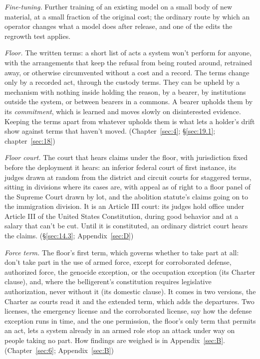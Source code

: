 \emph{Fine-tuning.} Further training of an existing model on a small body of new material, at a small fraction of the original cost; the ordinary route by which an operator changes what a model does after release, and one of the edits the regrowth test applies.

\emph{Floor.} The written terms: a short list of acts a system won't perform for anyone, with the arrangements that keep the refusal from being routed around, retrained away, or otherwise circumvented without a cost and a record. The terms change only by a recorded act, through the custody terms. They can be upheld by a mechanism with nothing inside holding the reason, by a bearer, by institutions outside the system, or between bearers in a commons. A bearer upholds them by its \emph{commitment}, which is learned and moves slowly on disinterested evidence. Keeping the terms apart from whatever upholds them is what lets a holder's drift show against terms that haven't moved. (Chapter~\ref{sec:4}; \S\ref{sec:19.1}; chapter~\ref{sec:18})

\emph{Floor court.} The court that hears claims under the floor, with jurisdiction fixed before the deployment it hears: an inferior federal court of first instance, its judges drawn at random from the district and circuit courts for staggered terms, sitting in divisions where its cases are, with appeal as of right to a floor panel of the Supreme Court drawn by lot, and the abolition statute's claims going on to the immigration division. It is an Article III court: its judges hold office under Article III of the United States Constitution, during good behavior and at a salary that can't be cut. Until it is constituted, an ordinary district court hears the claims. (\S\ref{sec:14.3}; Appendix~\ref{sec:D})

\emph{Force term.} The floor's first term, which governs whether to take part at all: don't take part in the use of armed force, except for corroborated defense, authorized force, the genocide exception, or the occupation exception (its Charter clause), and, where the belligerent's constitution requires legislative authorization, never without it (its domestic clause). It comes in two versions, the Charter as courts read it and the extended term, which adds the departures. Two licenses, the emergency license and the corroborated license, say how the defense exception runs in time, and the one permission, the floor's only term that permits an act, lets a system already in an armed role stop an attack under way on people taking no part. How findings are weighed is in Appendix~\ref{sec:B}. (Chapter~\ref{sec:6}; Appendix~\ref{sec:B})


